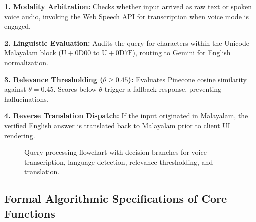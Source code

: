\documentclass[12pt,a4paper]{report}
\begin{document}
\vspace{2pt}
\noindent\textbf{1. Modality Arbitration:} Checks whether input arrived as raw text or spoken voice audio, invoking the Web Speech API for transcription when voice mode is engaged.\par\vspace{2pt}
\noindent\textbf{2. Linguistic Evaluation:} Audits the query for characters within the Unicode Malayalam block ($\mathrm{U{+}0D00}$ to $\mathrm{U{+}0D7F}$), routing to Gemini for English normalization.\par\vspace{2pt}
\noindent\textbf{3. Relevance Thresholding ($\theta \ge 0.45$):} Evaluates Pinecone cosine similarity against $\theta = 0.45$. Scores below $\theta$ trigger a fallback response, preventing hallucinations.\par\vspace{2pt}
\noindent\textbf{4. Reverse Translation Dispatch:} If the input originated in Malayalam, the verified English answer is translated back to Malayalam prior to client UI rendering.

\clearpage
\begin{figure}[p]
    \centering
    \caption{Query processing flowchart with decision branches for voice transcription, language detection, relevance thresholding, and translation.}
    \label{fig:multiagent_flowchart}
\end{figure}
\clearpage

\subsection{Formal Algorithmic Specifications of Core Functions}
\end{document}

